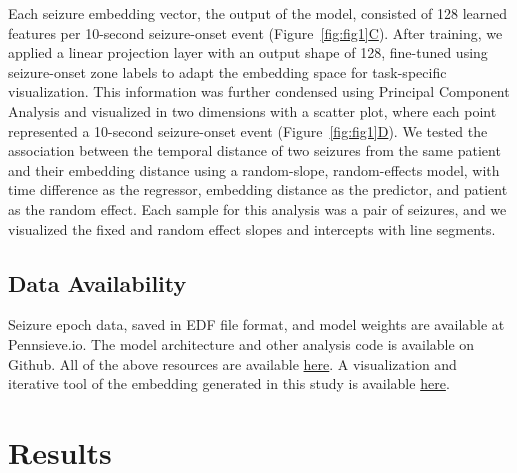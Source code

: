 \documentclass[11pt]{article}
\begin{document}
Each seizure embedding vector, the output of the model, consisted of 128 learned features per 10-second seizure-onset event (Figure~\hyperref[fig:fig1]{\ref*{fig:fig1}C}). After training, we applied a linear projection layer with an output shape of 128, fine-tuned using seizure-onset zone labels to adapt the embedding space for task-specific visualization. This information was further condensed using Principal Component Analysis and visualized in two dimensions with a scatter plot, where each point represented a 10-second seizure-onset event (Figure~\hyperref[fig:fig1]{\ref*{fig:fig1}D}). We tested the association between the temporal distance of two seizures from the same patient and their embedding distance using a random-slope, random-effects model, with time difference as the regressor, embedding distance as the predictor, and patient as the random effect. Each sample for this analysis was a pair of seizures, and we visualized the fixed and random effect slopes and intercepts with line segments.

\subsection*{Data Availability}
Seizure epoch data, saved in EDF file format, and model weights are available at Pennsieve.io\cite{goldblum2024pennsieve}. The model architecture and other analysis code is available on Github. All of the above resources are available \href{https://github.com/sirrus98/ieeg_sz_embedding}{here}. A visualization and iterative tool of the embedding generated in this study is available \href{https://ieeg-atlas.onrender.com/}{here}. 

\section*{Results}
\end{document}
